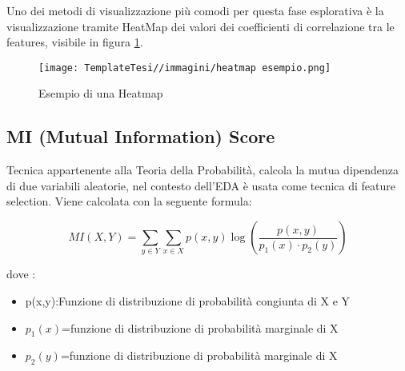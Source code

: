 \begin{flushleft}
Uno dei metodi di visualizzazione più comodi per questa fase esplorativa è la visualizzazione tramite HeatMap dei valori dei coefficienti di correlazione tra le features, visibile in figura \ref{fig:heatmapesempio}.
\begin{figure}[H]
    \centering
    \texttt{[image: TemplateTesi//immagini/heatmap esempio.png]}
    \caption{Esempio di una Heatmap \cite{ImmHeatMap}}
    \label{fig:heatmapesempio}
\end{figure}
\subsection{MI (Mutual Information) Score}
Tecnica appartenente alla Teoria della Probabilità, calcola la mutua dipendenza di due variabili aleatorie, nel contesto dell'EDA è usata come tecnica di feature selection.
Viene calcolata con la seguente formula:


$$MI(X, Y) = \sum\limits_{y \in Y}\sum\limits_{x \in X} p(x, y) \log \left( \frac{p(x, y)}{p_1(x) \cdot p_2(y)} \right)
$$

dove :
\begin{itemize}
    \item p(x,y):Funzione di distribuzione di probabilità congiunta di X e Y
    \item $p_1(x)$=funzione di distribuzione di probabilità marginale di X
    \item $p_2(y)$=funzione di distribuzione di probabilità marginale di X
\end{itemize}
\end{flushleft}
